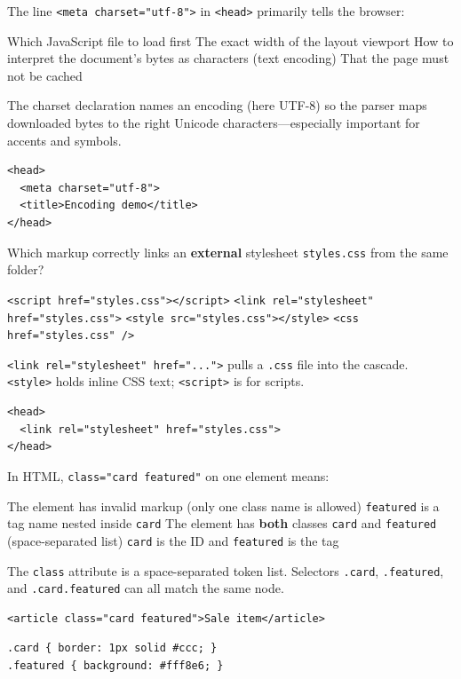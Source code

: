 \question[4]
The line \texttt{<meta charset="utf-8">} in \texttt{<head>} primarily tells the browser:
\begin{choices}
  \choice Which JavaScript file to load first
  \choice The exact width of the layout viewport
  \CorrectChoice How to interpret the document's bytes as characters (text encoding)
  \choice That the page must not be cached
\end{choices}
\begin{solution}
  The charset declaration names an encoding (here UTF-8) so the parser maps downloaded bytes to the right Unicode characters---especially important for accents and symbols.
\begin{lstlisting}[style=htmlinline]
<head>
  <meta charset="utf-8">
  <title>Encoding demo</title>
</head>
\end{lstlisting}
\end{solution}

\question[4]
Which markup correctly links an \textbf{external} stylesheet \texttt{styles.css} from the same folder?
\begin{choices}
  \choice \texttt{<script href="styles.css"></script>}
  \CorrectChoice \texttt{<link rel="stylesheet" href="styles.css">}
  \choice \texttt{<style src="styles.css"></style>}
  \choice \texttt{<css href="styles.css" />}
\end{choices}
\begin{solution}
  \texttt{<link rel="stylesheet" href="...">} pulls a \texttt{.css} file into the cascade. \texttt{<style>} holds inline CSS text; \texttt{<script>} is for scripts.
\begin{lstlisting}[style=htmlinline]
<head>
  <link rel="stylesheet" href="styles.css">
</head>
\end{lstlisting}
\end{solution}

\newpage

\question[4]
In HTML, \texttt{class="card featured"} on one element means:
\begin{choices}
  \choice The element has invalid markup (only one class name is allowed)
  \choice \texttt{featured} is a tag name nested inside \texttt{card}
  \CorrectChoice The element has \textbf{both} classes \texttt{card} and \texttt{featured} (space-separated list)
  \choice \texttt{card} is the ID and \texttt{featured} is the tag
\end{choices}
\begin{solution}
  The \texttt{class} attribute is a space-separated token list. Selectors \texttt{.card}, \texttt{.featured}, and \texttt{.card.featured} can all match the same node.
\begin{lstlisting}[style=htmlinline]
<article class="card featured">Sale item</article>
\end{lstlisting}
\begin{lstlisting}[style=cssinline]
.card { border: 1px solid #ccc; }
.featured { background: #fff8e6; }
\end{lstlisting}
\end{solution}

